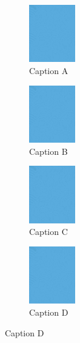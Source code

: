 \documentclass[varwidth, border=1pt]{standalone}
\begin{document}
		
	\begin{figure}	
		\begin{subfigure}{6cm}
			\centering\includegraphics[width=2cm]{figure_part.jpg}
			\captionsetup{justification=centering}
			\caption{Caption A}
		\end{subfigure}	
		\begin{subfigure}{6cm}
			\centering\includegraphics[width=2cm]{figure_part.jpg}
			\captionsetup{justification=centering}
			\caption{Caption B}
		\end{subfigure}		
		\begin{subfigure}{6cm}
			\centering\includegraphics[width=2cm]{figure_part.jpg}
			\captionsetup{justification=centering}
			\caption{Caption C}
		\end{subfigure}	
		\begin{subfigure}{6cm}
			\centering\includegraphics[width=2cm]{figure_part.jpg}
			\captionsetup{justification=centering}
			\caption{Caption D}
		\end{subfigure}	
	\end{figure}	
\end{document}
